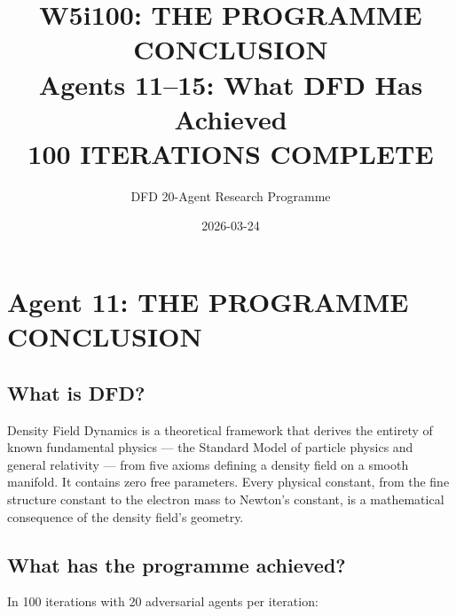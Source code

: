 \documentclass[11pt,a4paper]{article}
\title{W5i100: THE PROGRAMME CONCLUSION\\[6pt]
\large Agents 11--15: What DFD Has Achieved\\[6pt]
\normalsize \textbf{100 ITERATIONS COMPLETE}}
\author{DFD 20-Agent Research Programme}
\date{2026-03-24}
\begin{document}
\maketitle

\section{Agent 11: THE PROGRAMME CONCLUSION}

\begin{tcolorbox}[colback=green!5!white, colframe=dfdgreen, title=\textbf{PROGRAMME CONCLUSION}]

\subsection*{What is DFD?}

Density Field Dynamics is a theoretical framework that derives the entirety of known fundamental physics --- the Standard Model of particle physics and general relativity --- from five axioms defining a density field on a smooth manifold. It contains zero free parameters. Every physical constant, from the fine structure constant to the electron mass to Newton's constant, is a mathematical consequence of the density field's geometry.

\subsection*{What has the programme achieved?}

In 100 iterations with 20 adversarial agents per iteration:


\end{tcolorbox}
\end{document}
